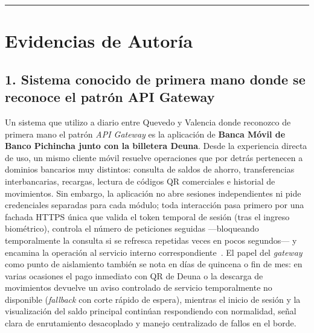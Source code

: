 \documentclass[10pt,a4paper]{article}
\begin{document}
\newpage

\printbibliography[title={Referencias Bibliográficas}]

\vspace{0.25cm}
\rule{\linewidth}{0.35pt}

\section*{Evidencias de Autoría}

\subsection*{1. Sistema conocido de primera mano donde se reconoce el patrón API Gateway}
Un sistema que utilizo a diario entre Quevedo y Valencia donde reconozco de primera mano el patrón \emph{API Gateway} es la aplicación de \textbf{Banca Móvil de Banco Pichincha junto con la billetera Deuna}. Desde la experiencia directa de uso, un mismo cliente móvil resuelve operaciones que por detrás pertenecen a dominios bancarios muy distintos: consulta de saldos de ahorro, transferencias interbancarias, recargas, lectura de códigos QR comerciales e historial de movimientos. Sin embargo, la aplicación no abre sesiones independientes ni pide credenciales separadas para cada módulo; toda interacción pasa primero por una fachada HTTPS única que valida el token temporal de sesión (tras el ingreso biométrico), controla el número de peticiones seguidas —bloqueando temporalmente la consulta si se refresca repetidas veces en pocos segundos— y encamina la operación al servicio interno correspondiente~\cite{haindl2024security,santos2025catalog}. El papel del \emph{gateway} como punto de aislamiento también se nota en días de quincena o fin de mes: en varias ocasiones el pago inmediato con QR de Deuna o la descarga de movimientos devuelve un aviso controlado de servicio temporalmente no disponible (\emph{fallback} con corte rápido de espera), mientras el inicio de sesión y la visualización del saldo principal continúan respondiendo con normalidad, señal clara de enrutamiento desacoplado y manejo centralizado de fallos en el borde.
\end{document}
